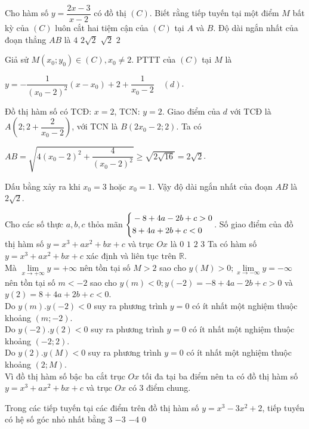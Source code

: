 \begin{ex}%
Cho hàm số $y=\dfrac{2x-3}{x-2}$ có đồ thị $(C)$. Biết rằng tiếp tuyến tại một điểm $M$ bất kỳ của $(C)$ luôn cắt hai tiệm cận của $(C)$ tại $A$ và $B$. Độ dài ngắn nhất của đoạn thẳng $AB$ là
\choice
{$4$}
{\True $2\sqrt{2}$}
{$\sqrt{2}$}
{$2$}
\loigiai
{Giả sử $M(x_0; y_0)\in (C), x_0\neq 2$. PTTT của $(C)$ tại $M$ là
\begin{center}$y=-\dfrac{1}{(x_0-2)^2}(x-x_0)+2+\dfrac{1}{x_0-2}\quad (d)$.\end{center}
Đồ thị hàm số có TCĐ: $x=2$, TCN: $y=2$. Giao điểm của $d$ với TCĐ là $A\left(2; 2+\dfrac{2}{x_0-2}\right)$, với TCN là $B\left(2x_0-2; 2\right)$. Ta có
\begin{center}$AB=\sqrt{4(x_0-2)^2+\dfrac{4}{(x_0-2)^2}}\geq\sqrt{2\sqrt{16}}=2\sqrt{2}$.\end{center}
Dấu bằng xảy ra khi $x_0=3$ hoặc $x_0=1$. Vậy độ dài ngắn nhất của đoạn $AB$ là $2\sqrt{2}$.
}
\end{ex}

\begin{ex}%
Cho các số thực $a, b, c$ thỏa mãn $\left\{\begin{aligned}&-8+4a-2b+c>0\\&8+4a+2b+c<0\end{aligned}\right.$. Số giao điểm của đồ thị hàm số $y=x^3+ax^2+bx+c$ và trục $Ox$ là
\choice
{$0$}
{$1$}
{$2$}
{\True $3$}
\loigiai
{Ta có hàm số $y=x^3+ax^2+bx+c$ xác định và liên tục trên $\mathbb{R}$.\\
	Mà $\lim\limits_{x\rightarrow +\infty} y=+\infty $ nên tồn tại số $M>2$ sao cho $y(M)>0;\lim\limits_{x\rightarrow -\infty}y=-\infty$ nên tồn tại số $m<-2$ sao cho $y(m)<0;y(-2)=-8+4a-2b+c>0$ và $y(2)=8+4a+2b+c<0$.\\
	Do $y(m).y(-2)<0$ suy ra phương trình $y=0$ có ít nhất một nghiệm thuộc khoảng $(m;-2)$.\\
	Do $y(-2).y(2)<0$ suy ra phương trình $y=0$ có ít nhất một nghiệm thuộc khoảng $(-2;2)$.\\
	Do $y(2).y(M)<0$ suy ra phương trình $y=0$ có ít nhất một nghiệm thuộc khoảng $(2;M)$.\\
	Vì đồ thị hàm số bậc ba cắt trục $Ox$ tối đa tại ba điểm nên ta có đồ thị hàm số $y=x^3+ax^2+bx+c$ và trục $Ox$ có $3$ điểm chung.
}
\end{ex}

\begin{ex}%
Trong các tiếp tuyến tại các điểm trên đồ thị hàm số $y=x^3-3x^2+2$, tiếp tuyến có hệ số góc nhỏ nhất bằng
\choice
{$3$}
{\True $-3$}
{$-4$}
{$0$}
\end{ex}

